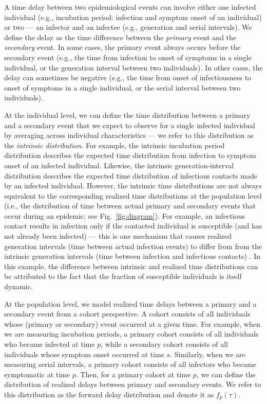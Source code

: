 \documentclass[12pt]{article}
\newcommand{\fref}[1]{Fig.~\ref{fig:#1}}
\newcommand{\psymp}{\ensuremath{p}} %
\newcommand{\ssymp}{\ensuremath{s}} %
\begin{document}
A time delay between two epidemiological events can involve either one infected individual (e.g., incubation period: infection and symptom onset of an individual) or two --- an infector and an infectee (e.g., generation and serial intervals).
We define the delay as the time difference between the \emph{primary} event and the \emph{secondary} event.
In some cases, the primary event always occurs before the secondary event (e.g., the time from infection to onset of symptoms in a single individual, or the generation interval between two individuals). 
In other cases, the delay can sometimes be negative (e.g., the time from onset of infectiousness to onset of symptoms in a single individual, or the serial interval between two individuals).

At the individual level, we can define the time distribution between a primary and a secondary event that we expect to observe for a single infected individual by averaging across individual characteristics --- we refer to this distribution as the \emph{intrinsic distribution}.
For example, the intrinsic incubation period distribution describes the expected time distribution from infection to symptom onset of an infected individual.
Likewise, the intrinsic generation-interval distribution describes the expected time distribution of infectious contacts made by an infected individual.
However, the intrinsic time distributions are not always equivalent to the corresponding realized time distributions at the population level (i.e., the distribution of time between actual primary and secondary events that occur during an epidemic; see \fref{diagram}).
For example, an infectious contact results in infection only if the contacted individual is susceptible (and has not already been infected) ---
this is one mechanism that causes realized generation intervals (time between actual infection events) to differ from from the intrinsic generation intervals (time between infection and infectious contacts) \citep{park2020inferring}.
In this example, the difference between intrinsic and realized time distributions can be attributed to the fact that the fraction of susceptible individuals is itself dynamic.

At the population level, we model realized time delays between a primary and a secondary event from a cohort perspective.
A cohort consists of all individuals whose (primary or secondary) event occurred at a given time.
For example, when we are measuring incubation periods, a primary cohort consists of all individuals who became infected at time \psymp, while a secondary cohort consists of all individuals whose symptom onset occurred at time \ssymp.
Similarly, when we are measuring serial intervals, a primary cohort consists of all infectors who became symptomatic at time \psymp.
Then, for a primary cohort at time \psymp, we can define the distribution of realized delays between primary and secondary events. 
We refer to this distribution as the forward delay distribution and denote it as $f_\psymp(\tau)$.
\end{document}
